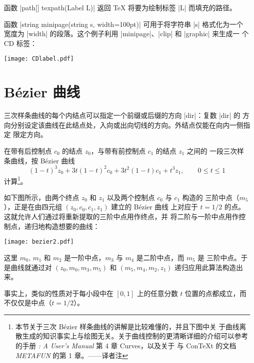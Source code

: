 \documentclass[nofonts,CJKnormalspaces]{ctexbook}[2009/05/20]
\let\leq\leqslant
\newcommand\transnote[1]{\footnote{#1——译者注}}
\begin{document}
函数 |path[] texpath(Label L)| 返回 \TeX{} 将要为绘制标签 |L| 而填充的路径。

函数 |string minipage(string s, width=100pt)| 可用于将字符串 |s| 格式化为一个
宽度为 |width| 的段落。这个例子利用 |minipage|、|clip| 和 |graphic| 来生成一
个 CD 标签：
\begin{center}
  \texttt{[image: CDlabel.pdf]}
\end{center}





\chapter{Bézier 曲线}
\label{chap:bezier}

三次样条曲线的每个内结点可以指定一个前缀或后缀的方向 |{dir}|：复数 |dir| 的
方向分别设定该曲线在此结点处，入向或出向切线的方向。外结点仅能在向内一侧指定
限定方向。

在带有后控制点 $c_0$ 的结点 $z_0$，与带有前控制点 $c_1$ 的结点 $z_1$ 之间的
一段三次样条曲线，按 Bézier 曲线
\begin{equation*}
  (1-t)^3 z_0 + 3t(1-t)^2 c_0 + 3t^2 (1-t) c_1 + t^3 z_1, \qquad 0\leq t\leq 1
\end{equation*}
计算\transnote{本节关于三次 Bézier 样条曲线的讲解是比较难懂的，并且下图中关
于曲线离散生成的知识事实上与绘图无关。关于曲线控制的更清晰详细的介绍可以参考
\MP{} 的手册 \textit{\MP{}: A User's Manual} 第 4 章 Curves，以及关于 \MP{} 
与 Con\TeX{}t 的文档 \textit{METAFUN} 的第 1 章。}。

如下图所示，由两个终点 $z_0$ 和 $z_1$ 以及两个控制点 $c_0$ 与 $c_1$ 构造的
三阶中点（$m_5$），正是在由四元组 $(z_0, c_0, c_1, z_1)$ 建立的 Bézier 曲线
上对应于 $t = 1/2$ 的点。这就允许人们通过将重新提取的三阶中点用作终点，并
将二阶与一阶中点用作控制点，递归地构造想要的曲线：
\begin{center}
  \texttt{[image: bezier2.pdf]}
\end{center}
这里 $m_0$, $m_1$ 和 $m_2$ 是一阶中点，$m_3$ 与 $m_4$ 是二阶中点，而 $m_5$ 是
三阶中点。于是曲线就通过对 $(z_0, m_0, m_3, m_5)$ 和 $(m_5, m_4, m_2, z_1)$
递归应用此算法构造出来。

事实上，类似的性质对于每小段中在 $[0,1]$ 上的任意分数 $t$ 位置的点都成立，而
不仅仅是中点（$t=1/2$）。
\end{document}
